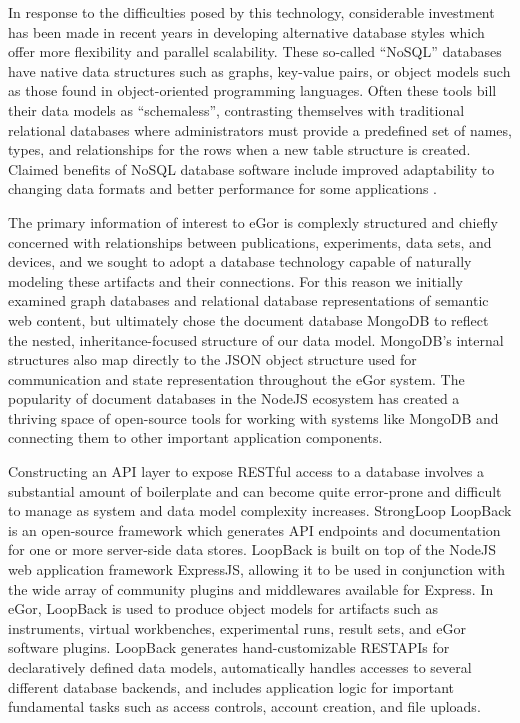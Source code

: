 \documentclass[../thesis]{subfiles}
\begin{document}
In response to the difficulties posed by this technology, considerable
investment has been made in recent years in developing alternative
database styles which offer more flexibility and parallel
scalability. These so-called ``NoSQL'' databases have native data
structures such as graphs, key-value pairs, or object models such as
those found in object-oriented programming languages. Often these
tools bill their data models as ``schemaless'', contrasting themselves
with traditional relational databases where administrators must
provide a predefined set of names, types, and relationships for the
rows when a new table structure is created. Claimed benefits of NoSQL
database software include improved adaptability to changing data
formats and better performance for some applications
\cite{Leavitt:2010:NDL:1731101.1731109}.

The primary information of interest to eGor is complexly
structured and chiefly concerned with relationships between
publications, experiments, data sets, and devices, and we sought to
adopt a database technology capable of naturally modeling these
artifacts and their connections. For this reason we initially examined
graph databases and relational database representations of semantic
web content, but ultimately chose the document database MongoDB to
reflect the nested, inheritance-focused structure of our data
model. MongoDB's internal structures also map directly to the
\gls{JSON} object structure used for communication and state
representation throughout the eGor system. The popularity of document
databases in the NodeJS ecosystem has created a thriving space of
open-source tools for working with systems like MongoDB and connecting
them to other important application components.

Constructing an \gls{API} layer to expose \gls{REST}ful access to a
database involves a substantial amount of boilerplate and can become
quite error-prone and difficult to manage as system and data model
complexity increases. StrongLoop LoopBack \cite{LoopBack} is an
open-source framework which generates \gls{API} endpoints and
documentation for one or more server-side data stores.
LoopBack is built on top of the NodeJS web application framework
ExpressJS, allowing it to be used in conjunction with the wide array of
community plugins and middlewares available for Express. In eGor,
LoopBack is used to produce object models for artifacts such as
instruments, virtual workbenches, experimental runs, result sets, and
eGor software plugins. LoopBack generates hand-customizable
\glspl{RESTAPI} for declaratively defined data models, automatically
handles accesses to several different database backends,
and includes application logic for important fundamental tasks such as
access controls, account creation, and file uploads.
\end{document}
